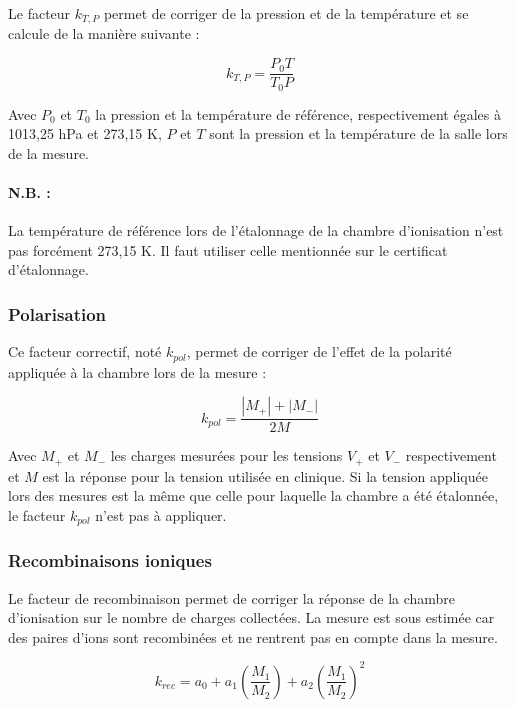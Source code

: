 \documentclass{article}
\begin{document}
Le facteur $k_{T,P}$ permet de corriger de la pression et de la température et se calcule de la manière suivante :

\begin{equation}
  k_{T,P} = \dfrac{P_0T}{T_0P}
  \label{eq_k_TP}
\end{equation}

Avec $P_0$ et $T_0$ la pression et la température de référence, respectivement égales à 1013,25 hPa et 273,15 K, $P$ et $T$ sont la pression et la température de la salle lors de la mesure.

\paragraph*{N.B. :} La température de référence lors de l'étalonnage de la chambre d'ionisation n'est pas forcément 273,15 K. Il faut utiliser celle mentionnée sur le certificat d'étalonnage.

\subsubsection{Polarisation}

Ce facteur correctif, noté $k_{pol}$, permet de corriger de l'effet de la polarité appliquée à la chambre lors de la mesure :

\begin{equation}
  k_{pol} = \dfrac{|M_+| + |M_-|}{2M}
  \label{eq_pol}
\end{equation}

Avec $M_+$ et $M_-$ les charges mesurées pour les tensions $V_+$ et $V_-$ respectivement et $M$ est la réponse pour la tension utilisée en clinique. Si la tension appliquée lors des mesures est la même que celle pour laquelle la chambre a été étalonnée, le facteur $k_{pol}$ n'est pas à appliquer.

\subsubsection{Recombinaisons ioniques}

Le facteur de recombinaison permet de corriger la réponse de la chambre d'ionisation sur le nombre de charges collectées. La mesure est sous estimée car des paires d'ions sont recombinées et ne rentrent pas en compte dans la mesure.

\begin{equation}
  k_{rec} = a_0 + a_1 \left(\dfrac{M_1}{M_2}\right) + a_2 \left(\dfrac{M_1}{M_2}\right) ^2
  \label{eq_rec}
\end{equation}
\end{document}
